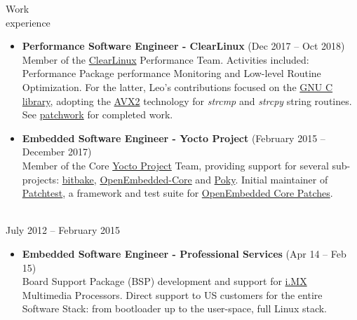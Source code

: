 \documentclass{resume}
\def\fsl{Freescale Semiconductor}
\begin{document}
\begin{category}{Work \\experience}
\begin{itemize}
\item \textbf{Performance Software Engineer - ClearLinux} (Dec 2017 -- Oct 2018)\\
  Member of the \href{https://clearlinux.org/}{ClearLinux} Performance Team.
  Activities included: Performance Package performance Monitoring and Low-level Routine Optimization.
  For the latter, Leo's contributions focused on the \href{https://www.gnu.org/software/libc/}{GNU C library},
  adopting the \href{}{AVX2} technology for \textit{strcmp} and \textit{strcpy} string routines.
  See \href{https://patchwork.ozlabs.org/project/glibc/list/?submitter=74072}{patchwork}
  for completed work.
\end{itemize}

\begin{itemize}
\item \textbf{Embedded Software Engineer - Yocto Project} (February 2015 -- December 2017)\\
  Member of the Core \href{https://www.yoctoproject.org/}{Yocto Project} Team,
  providing support for several sub-projects:
  \href{https://lists.openembedded.org/g/bitbake-devel/search?p=recentpostdate%252Fsticky%2C%2C%2C20%2C2%2C0%2C0&q=Leonardo+Sandoval}{bitbake},
  \href{https://lists.openembedded.org/g/openembedded-core/search?p=recentpostdate%252Fsticky%2C%2C%2C20%2C2%2C0%2C0&q=Leonardo+Sandoval}{OpenEmbedded-Core} and
    \href{https://lists.yoctoproject.org/g/poky/search?p=created%2C0%2C%2C1%2C2%2C0%2C0&q=Leonardo+Sandoval}{Poky}. Initial maintainer of
      \href{http://git.yoctoproject.org/cgit/cgit.cgi/patchtest/}{Patchtest},
    a framework and test suite for \href{https://patchwork.openembedded.org/project/oe-core/series/?ordering=-last_updated}{OpenEmbedded Core Patches}.
\end{itemize}

\citem{\fsl}\\
July 2012 -- February 2015
\begin{itemize}
\item \textbf{Embedded Software Engineer - Professional Services} (Apr 14 -- Feb 15)\\
  Board Support Package (BSP) development and support for
  \href{https://www.nxp.com/products/processors-and-microcontrollers/arm-processors/i-mx-applications-processors:IMX_HOME}{i.MX}
  Multimedia Processors. Direct support to US customers for the entire Software Stack: from bootloader up to the user-space, full Linux
  stack.
\end{itemize}


\end{category}
\end{document}
